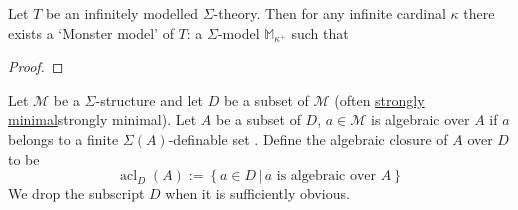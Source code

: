 \documentclass{book}
\newcommand{\set}[1]{\left\{#1\right\}}
\newcommand{\st}{\,|\,}
\newcommand{\ka}{\kappa}
\newcommand{\Si}{\Sigma}
\newcommand{\M}{\mathbb{M}}
\newcommand{\MM}{\mathcal{M}}
\newcommand{\NN}{\mathcal{N}}
\newcommand{\abs}[1]{\left\vert #1 \right\vert}
\newcommand{\<}{\langle}
\renewcommand{\>}{\rangle}
\newcommand{\model}[1]{\vDash_{#1}}
\DeclareMathOperator{\acl}{\mathrm{acl}}
\newcommand{\linkto}[2]{\hyperlink{#1}{#2}}
\theoremstyle{definitionstyle}
\theoremstyle{exercisestyle}
\theoremstyle{remarkstyle}
\newenvironment{cd}{
    \begin{figure}[H]
    \centering
    \begin{tikzcd}
}{
    \end{tikzcd}
    \end{figure}
}
\begin{document}
\begin{dfn}
    Let $T$ be an infinitely modelled $\Si$-theory.
    Then for any infinite cardinal $\ka$ there exists a `Monster model' of $T$: 
    a $\Si$-model $\M_{\ka^+}$ such that 
\end{dfn}
\begin{proof}
\end{proof}



\begin{dfn}
    Let $\MM$ be a $\Si$-structure and let $D$ be a subset of $\MM$
    (often \linkto{strongly_minimal}{strongly minimal}strongly minimal).
    Let $A$ be a subset of $D$, 
    $a \in \MM$ is algebraic over $A$ if $a$ belongs to a finite 
    $\Si(A)$-definable set .
    Define the algebraic closure of $A$ over $D$ to be
    \[\acl_D(A) := \set{a \in D \st a \text{ is algebraic over } A}\]
    We drop the subscript $D$ when it is sufficiently obvious.
\end{dfn}
\end{document}
